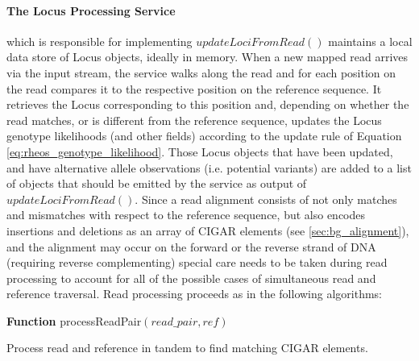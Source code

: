\paragraph{The Locus Processing Service} which is responsible for implementing $updateLociFromRead()$ maintains a local data store of Locus objects, ideally in memory. When a new mapped read arrives via the input stream, the service walks along the read and for each position on the read compares it to the respective position on the reference sequence. It retrieves the Locus corresponding to this position and, depending on whether the read matches, or is different from the reference sequence, updates the Locus genotype likelihoods (and other fields) according to the update rule of Equation \ref{eq:rheos_genotype_likelihood}. Those Locus objects that have been updated, and have alternative allele observations (i.e. potential variants) are added to a list of objects that should be emitted by the service as output of $updateLociFromRead()$. Since a read alignment consists of not only matches and mismatches with respect to the reference sequence, but also encodes insertions and deletions as an array of CIGAR elements (see \ref{sec:bg_alignment}), and the alignment may occur on the forward or the reverse strand of DNA (requiring reverse complementing) special care needs to be taken during read processing to account for all of the possible cases of simultaneous read and reference traversal. Read processing proceeds as in the following algorithms:

\begin{algorithm2e}[h]
    \DontPrintSemicolon
    \footnotesize
    \textbf{Function} {\sc processReadPair}$(read\_pair, ref)$
    \caption{Process read and reference in tandem to find matching CIGAR elements.}\label{ag:process_read_pair}
\end{algorithm2e}

